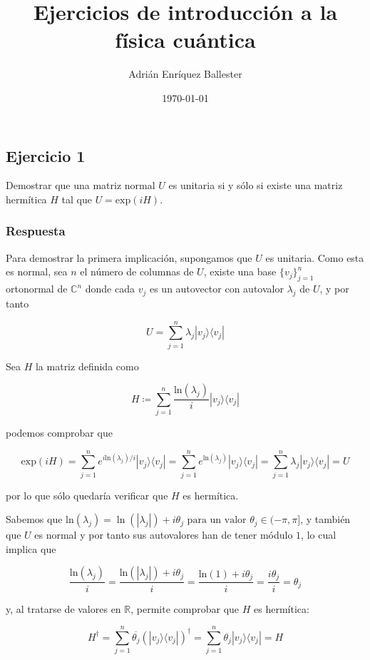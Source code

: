 \documentclass{article}
\title{Ejercicios de introducción a la física cuántica}
\author{Adrián Enríquez Ballester}
\date{\today}
\begin{document}
\maketitle

\subsection*{Ejercicio 1}

Demostrar que una matriz normal $U$ es unitaria si y sólo
si existe una matriz hermítica $H$ tal que $U = \text{exp}
(iH)$.

\subsubsection*{Respuesta}

Para demostrar la primera implicación, supongamos que $U$ 
es unitaria. Como esta es normal, sea $n$ el número de 
columnas de $U$, existe una base $\{v_j\}_{j=1}^n$ 
ortonormal de $\mathbb{C}^n$ donde cada $v_j$ es un 
autovector con autovalor $\lambda_j$ de $U$, y por tanto

$$
U = \sum_{j=1}^n \lambda_j |v_j \rangle\langle v_j|
$$

Sea $H$ la matriz definida como 

$$
  H \coloneqq \sum_{j=1}^n \frac{\text{ln}(\lambda_j)}{i} 
    |v_j \rangle\langle v_j|
$$

podemos comprobar que

$$
\text{exp}(iH) 
    = \sum_{j=1}^n e^{i\text{ln}(\lambda_j)/i}
      |v_j \rangle\langle v_j|
    = \sum_{j=1}^n e^{\text{ln}(\lambda_j)}
      |v_j \rangle\langle v_j|
    = \sum_{j=1}^n \lambda_j
      |v_j \rangle\langle v_j|
    = U
$$

por lo que sólo quedaría verificar que $H$ es hermítica.

Sabemos que 
$
\text{ln}(\lambda_j) = \ln(|\lambda_j|) + i\theta_j
  \text{ para un valor } \theta_j \in (-\pi, \pi] 
$, y también que $U$ es normal y por tanto sus autovalores 
han de tener módulo $1$, lo cual implica que 

$$
  \frac{\text{ln}(\lambda_j)}{i}
    = \frac{\text{ln}(|\lambda_j|) + i\theta_j}{i}
    = \frac{\text{ln}(1) + i\theta_j}{i}
    = \frac{i\theta_j}{i}
    = \theta_j
$$

y, al tratarse de valores en $\mathbb{R}$, permite comprobar que
$H$ es hermítica:

$$
  H^\dagger 
    = \sum_{j=1}^n \overline{\theta_j} 
        (|v_j \rangle\langle v_j|)^\dagger
    = \sum_{j=1}^n \theta_j 
      |v_j \rangle\langle v_j|
    = H
$$
\end{document}
